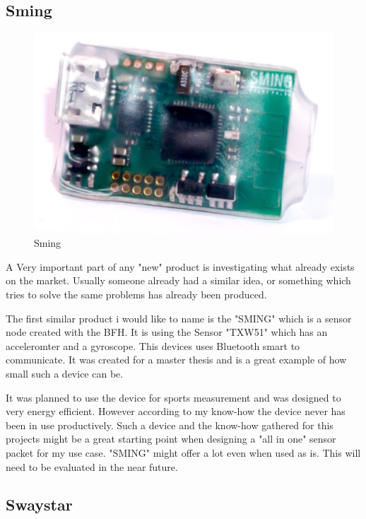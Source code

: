 \subsection{Sming}

\begin{figure}
  \begin{center}
\includegraphics[width=\linewidth]{images/sming_pic2.jpg}
  \end{center}
  \caption{\label{fig:Sming}Sming \cite{sming:book}}
\end{figure}
A Very important part of any "new" product is investigating what already exists on the market.
Usually someone already had a similar idea, or something which tries to solve the same problems has already been produced. 

The first similar product i would like to name is the "SMING" which is a sensor node created with the BFH. 
It is using the Sensor "TXW51" which has an acceleromter and a gyroscope. This devices uses Bluetooth smart to communicate. It was created for a master thesis and is a great example of how small such a device can be. 

It was planned to use the device for sports measurement and was designed to very energy efficient. However according to my know-how the device never has been in use productively. \cite{sming:book}
Such a device and the know-how gathered for this projects might be a great starting point when designing a "all in one" sensor packet for my use case. "SMING" might offer a lot even when used as is. This will need to be evaluated in the near future.

\subsection{Swaystar}

